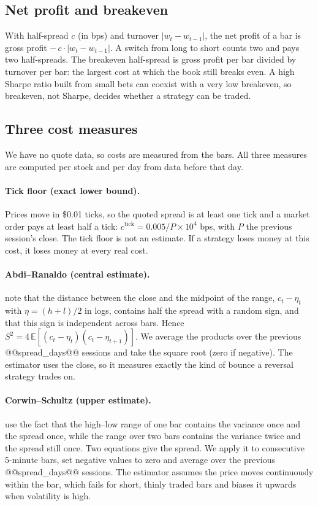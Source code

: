 \documentclass[11pt,a4paper]{article}
\newcommand{\E}{\mathbb{E}}
\begin{document}
\subsection{Net profit and breakeven}

With half-spread $c$ (in bps) and turnover $|w_t-w_{t-1}|$, the net profit of a bar is
gross profit $-\,c\cdot|w_t-w_{t-1}|$. A switch from long to short counts two and pays two half-spreads. The
breakeven half-spread is gross profit per bar divided by turnover per bar: the largest cost at which the
book still breaks even. A high Sharpe ratio built from small bets can coexist with a very low breakeven,
so breakeven, not Sharpe, decides whether a strategy can be traded.

\subsection{Three cost measures}

We have no quote data, so costs are measured from the bars. All three measures are computed per stock
and per day from data before that day.

\paragraph{Tick floor (exact lower bound).} Prices move in \$0.01 ticks, so the quoted spread is at least
one tick and a market order pays at least half a tick: $c^{\text{tick}} = 0.005/P\times10^4$ bps, with $P$
the previous session's close. The tick floor is not an estimate. If a strategy loses money at this cost, it loses
money at every real cost.

\paragraph{Abdi--Ranaldo (central estimate).} \citet{abdi2017} note that the distance between the close
and the midpoint of the range, $c_t-\eta_t$ with $\eta=(h+l)/2$ in logs, contains half the spread with a
random sign, and that this sign is independent across bars. Hence
$S^2 = 4\,\E[(c_t-\eta_t)(c_t-\eta_{t+1})]$. We average the products over the previous
@@spread_days@@ sessions and take the square root (zero if negative). The estimator uses the close, so it
measures exactly the kind of bounce a reversal strategy trades on.

\paragraph{Corwin--Schultz (upper estimate).} \citet{corwin2012} use the fact that the high--low range of
one bar contains the variance once and the spread once, while the range over two bars contains the
variance twice and the spread still once. Two equations give the spread. We apply it to consecutive
5-minute bars, set negative values to zero and average over the previous @@spread_days@@ sessions. The
estimator assumes the price moves continuously within the bar, which fails for short, thinly traded bars
and biases it upwards when volatility is high.
\end{document}
